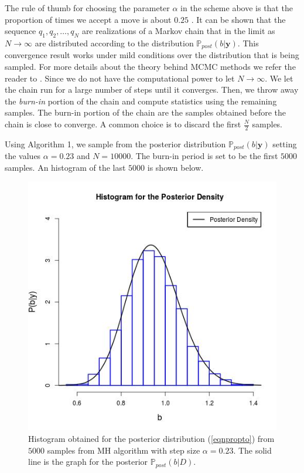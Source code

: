 \documentclass[12pt]{book}
\newcommand{\post}{\mathbb{P}_{post}}
\newcommand{\y}{\textbf{y}}
\begin{document}
The rule of thumb for choosing the parameter $\alpha$ in the scheme above is that   the proportion of times we accept
a move 
is about $0.25$ \cite{casella2008monte}. It can be shown that the sequence $q_{1},q_{2},\ldots,q_{N}$
are realizations of a Markov chain that in the limit as $N\rightarrow\infty$ are distributed according to the distribution
$\post(b|\y)$. This convergence result works under mild conditions over the distribution that is being sampled.
For more details about the theory behind MCMC methods we refer the reader to \cite{casella2008monte}. 
Since we do not have the computational power to let $N\rightarrow\infty$. We let the chain run for a large number of steps
until it converges. Then, we throw away the \textit{burn-in} portion of the chain and compute statistics using 
the remaining samples.  The burn-in portion of the chain are the samples obtained before the chain is close 
to converge. A common choice is to discard the first $\frac{N}{2}$ samples.
\newline


Using Algorithm 1, we sample from the posterior distribution $\post(b|\y)$ setting the values $\alpha=0.23$
and $N=10000$. The  burn-in  period is set to be  the first $5000$ samples. An histogram of the last $5000$
is shown below.

%


\begin{figure}[H]
\centering
\includegraphics[scale=0.60]{./FigChap3/histogram_mcmc.jpg}
\caption{Histogram obtained for the posterior distribution (\ref{eqnpropto}) 
from $5000$ samples from MH algorithm with step size $\alpha=0.23$. The solid line
is the  graph for the posterior $\post(b|D)$.}
\end{figure}
\end{document}
